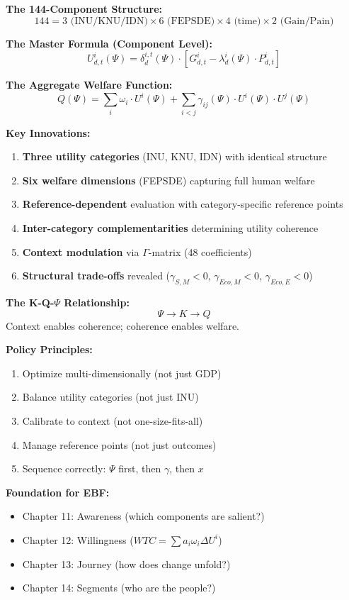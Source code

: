 \begin{tcolorbox}[colback=gray!5!white, colframe=gray!75!black, title=Chapter 10 Complete Summary]

\textbf{The 144-Component Structure:}
$$144 = 3 \text{ (INU/KNU/IDN)} \times 6 \text{ (FEPSDE)} \times 4 \text{ (time)} \times 2 \text{ (Gain/Pain)}$$

\textbf{The Master Formula (Component Level):}
$$U^i_{d,t}(\Psi) = \delta^{i,t}_d(\Psi) \cdot \left[ G^i_{d,t} - \lambda^i_d(\Psi) \cdot P^i_{d,t} \right]$$

\textbf{The Aggregate Welfare Function:}
$$Q(\Psi) = \sum_{i} \omega_i \cdot U^i(\Psi) + \sum_{i < j} \gamma_{ij}(\Psi) \cdot U^i(\Psi) \cdot U^j(\Psi)$$

\textbf{Key Innovations:}
\begin{enumerate}
\item \textbf{Three utility categories} (INU, KNU, IDN) with identical structure
\item \textbf{Six welfare dimensions} (FEPSDE) capturing full human welfare
\item \textbf{Reference-dependent} evaluation with category-specific reference points
\item \textbf{Inter-category complementarities} determining utility coherence
\item \textbf{Context modulation} via $\Gamma$-matrix (48 coefficients)
\item \textbf{Structural trade-offs} revealed ($\gamma_{S,M} < 0$, $\gamma_{Eco,M} < 0$, $\gamma_{Eco,E} < 0$)
\end{enumerate}

\textbf{The K-Q-$\Psi$ Relationship:}
$$\Psi \longrightarrow K \longrightarrow Q$$
Context enables coherence; coherence enables welfare.

\textbf{Policy Principles:}
\begin{enumerate}
\item Optimize multi-dimensionally (not just GDP)
\item Balance utility categories (not just INU)
\item Calibrate to context (not one-size-fits-all)
\item Manage reference points (not just outcomes)
\item Sequence correctly: $\Psi$ first, then $\gamma$, then $x$
\end{enumerate}

\textbf{Foundation for EBF:}
\begin{itemize}
\item Chapter 11: Awareness (which components are salient?)
\item Chapter 12: Willingness ($WTC = \sum a_i \omega_i \Delta U^i$)
\item Chapter 13: Journey (how does change unfold?)
\item Chapter 14: Segments (who are the people?)
\end{itemize}

\end{tcolorbox}

